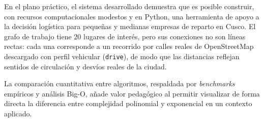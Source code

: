 En el plano práctico, el sistema desarrollado demuestra que es posible construir, con recursos computacionales modestos y en Python, una herramienta de apoyo a la decisión logística para pequeñas y medianas empresas de reparto en Cusco. El grafo de trabajo tiene 20 lugares de interés, pero sus conexiones no son líneas rectas: cada una corresponde a un recorrido por calles reales de OpenStreetMap descargado con perfil vehicular (\texttt{drive}), de modo que las distancias reflejan sentidos de circulación y desvíos reales de la ciudad.

La comparación cuantitativa entre algoritmos, respaldada por \textit{benchmarks} empíricos y análisis Big-O, añade valor pedagógico al permitir visualizar de forma directa la diferencia entre complejidad polinomial y exponencial en un contexto aplicado.
